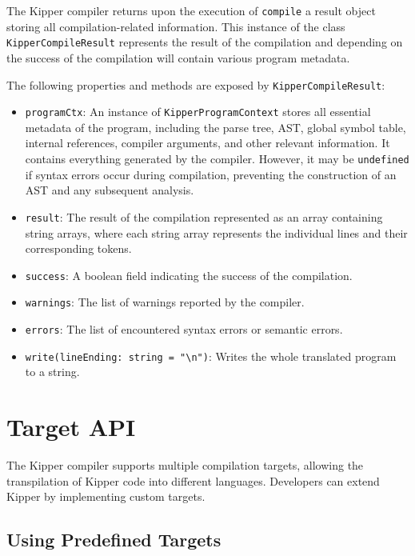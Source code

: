 The Kipper compiler returns upon the execution of \lstinline|compile| a result object storing all compilation-related information. This instance of the class \lstinline|KipperCompileResult| represents the result of the compilation and depending on the success of the compilation will contain various program metadata. 

The following properties and methods are exposed by \lstinline|KipperCompileResult|:

\begin{itemize}
	\item \lstinline|programCtx|: An instance of \lstinline|KipperProgramContext| stores all essential metadata of the program, including the parse tree, AST, global symbol table, internal references, compiler arguments, and other relevant information. It contains everything generated by the compiler. However, it may be \lstinline|undefined| if syntax errors occur during compilation, preventing the construction of an AST and any subsequent analysis.
	\item \lstinline|result|: The result of the compilation represented as an array containing string arrays, where each string array represents the individual lines and their corresponding tokens.
	\item \lstinline|success|: A boolean field indicating the success of the compilation.
	\item \lstinline|warnings|: The list of warnings reported by the compiler.
	\item \lstinline|errors|: The list of encountered syntax errors or semantic errors.
	\item \lstinline|write(lineEnding: string = "\n")|: Writes the whole translated program to a string.
\end{itemize}

\section{Target API}
\label{sec:target_api}

The Kipper compiler supports multiple compilation targets, allowing the \gls{transpilation} of Kipper code into different languages. Developers can extend Kipper by implementing custom targets.

\subsection{Using Predefined Targets}
\label{subsec:using_targets}

